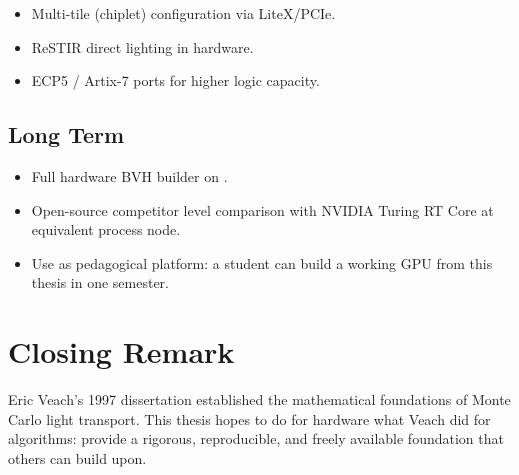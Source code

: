 \begin{itemize}
  \item Multi-tile (chiplet) \borg{} configuration via LiteX/PCIe.
  \item ReSTIR direct lighting in \borg{} hardware.
  \item ECP5 / Artix-7 ports for higher logic capacity.
\end{itemize}

\subsection{Long Term}

\begin{itemize}
  \item Full hardware BVH builder on \borg{}.
  \item Open-source competitor level comparison with NVIDIA Turing RT Core
    at equivalent process node.
  \item Use as pedagogical platform: a student can build a working GPU
    from this thesis in one semester.
\end{itemize}

\section{Closing Remark}

Eric Veach's 1997 dissertation established the mathematical foundations
of Monte Carlo light transport.
This thesis hopes to do for hardware what Veach did for algorithms:
provide a rigorous, reproducible, and freely available foundation
that others can build upon.
